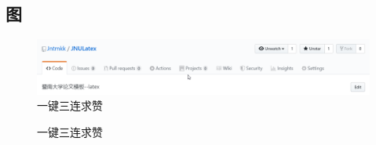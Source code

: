 \subsection{图}
\lipsum[1]
\begin{figure}[htbp]
    \centering
    \includegraphics[width=\textwidth]{image/star.png}
    \caption{一键三连求赞}
\end{figure}
\begin{figure}[htbp]
    \centering
    \caption{一键三连求赞}
\end{figure}
\lipsum[2]
